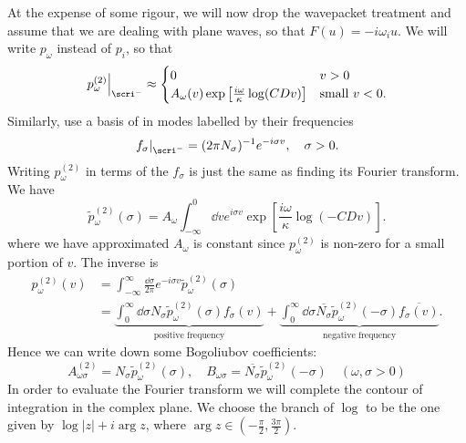 \documentclass{jknotes}
\begin{document}
At the expense of some rigour, we will now drop the wavepacket treatment and assume that we are dealing with plane waves, so that \(F(u)=-i\omega_i u\). We will write \(p_\omega\) instead of \(p_i\), so that
\begin{equation}
    \left.p_\omega^{(2)}\right|_{\scri^-} \approx
    \begin{cases}
        0 & v > 0 \\
        A_\omega(v)\exp\left[\frac{i\omega}{\kappa}\log(CDv)\right] & \text{small \(v<0\)}.
    \end{cases}
\end{equation}
Similarly, use a basis of in modes labelled by their frequencies
\begin{equation}
    \left.f_\sigma\right|_{\scri^-} = (2\pi N_\sigma)^{-1} e^{-i\sigma v},\quad \sigma > 0.
\end{equation}
Writing \(p_\omega^{(2)}\) in terms of the \(f_\sigma\) is just the same as finding its Fourier transform. We have
\begin{equation}
    \tilde{p}_\omega^{(2)}(\sigma) = A_\omega\int_{-\infty}^0 \dd{v} e^{i\sigma v} \exp\left[\frac{i\omega}{\kappa}\log(-CDv)\right].
\end{equation}
where we have approximated \(A_\omega\) is constant since \(p_\omega^{(2)}\) is non-zero for a small portion of \(v\). The inverse is
\begin{align}
    p_\omega^{(2)}(v) &= \int^\infty_{-\infty} \frac{\dd{\sigma}}{2\pi} e^{-i\sigma v} \tilde{p}_\omega^{(2)}(\sigma) \\
                      &= 
    \underbrace{\int_0^\infty \dd{\sigma} N_\sigma \tilde{p}_\omega^{(2)}(\sigma)f_\sigma(v)}_{\text{positive frequency}}
    +
    \underbrace{\int_0^\infty \dd{\sigma} \overline{N_\sigma} \tilde{p}_\omega^{(2)}(-\sigma)\overline{f_\sigma(v)}}_{\text{negative frequency}}.
\end{align}
Hence we can write down some Bogoliubov coefficients:
\begin{equation}
    A^{(2)}_{\omega\sigma} = N_\sigma\tilde{p}_\omega^{(2)}(\sigma),\quad
    B_{\omega\sigma} = \overline{N_\sigma}\tilde{p}_\omega^{(2)}(-\sigma)\quad
    (\omega,\sigma > 0)
\end{equation}
In order to evaluate the Fourier transform we will complete the contour of integration in the complex plane. We choose the branch of \(\log\) to be the one given by \(\log|z| + i\arg z\), where \(\arg z \in \left(-\frac{\pi}{2},\frac{3\pi}{2}\right)\).
\end{document}
